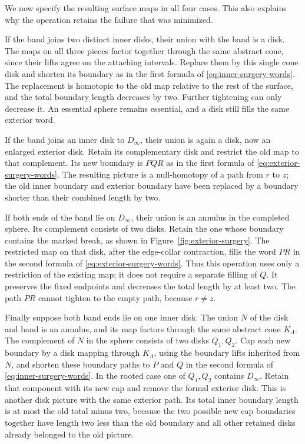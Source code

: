 We now specify the resulting surface maps in all four cases.  This
also explains why the operation retains the failure that was
minimized.

If the band joins two distinct inner disks, their union with the band
is a disk.  The maps on all three pieces factor together through the
same abstract cone, since their lifts agree on the attaching intervals.
Replace them by this single cone disk and shorten its boundary as in
the first formula of \eqref{eq:inner-surgery-words}.  The replacement
is homotopic to the old map relative to the rest of the surface, and
the total boundary length decreases by two.  Further tightening can
only decrease it.  An essential sphere remains essential, and a disk
still fills the same exterior word.

If the band joins an inner disk to $D_\infty$, their union is again a
disk, now an enlarged exterior disk.  Retain its complementary disk
and restrict the old map to that complement.  Its new boundary is
$PQR$ as in the first formula of \eqref{eq:exterior-surgery-words}.
The resulting picture is a null-homotopy of a path from $r$ to $z$;
the old inner boundary and exterior boundary have been replaced by a
boundary shorter than their combined length by two.

If both ends of the band lie on $D_\infty$, their union is an annulus
in the completed sphere.  Its complement consists of two disks.
Retain the one whose boundary contains the marked break, as shown
in Figure~\ref{fig:exterior-surgery}.  The restricted map on that disk,
after the edge-collar contraction, fills the word $PR$ in the second
formula of \eqref{eq:exterior-surgery-words}.  Thus this operation uses
only a restriction of the existing map; it does not require a
separate filling of $Q$.  It preserves the fixed endpoints and
decreases the total length by at least two.  The path $PR$ cannot
tighten to the empty path, because $r\ne z$.



Finally suppose both band ends lie on one inner disk.  The union $N$
of the disk and band is an annulus, and its map factors through the
same abstract cone $K_\Lambda$.  The complement of $N$ in the sphere
consists of two disks $Q_1,Q_2$.  Cap each new boundary by a disk
mapping through $K_\Lambda$, using the boundary lifts inherited from
$N$, and shorten these boundary paths to $P$ and $Q$ in the second
formula of \eqref{eq:inner-surgery-words}.  In the rooted case one of
$Q_1,Q_2$ contains $D_\infty$.  Retain that component with its new
cap and remove the formal exterior disk.  This is another disk
picture with the same exterior path.  Its total inner boundary length
is at most the old total minus two, because the two possible new cap
boundaries together have length two less than the old boundary and
all other retained disks already belonged to the old picture.

